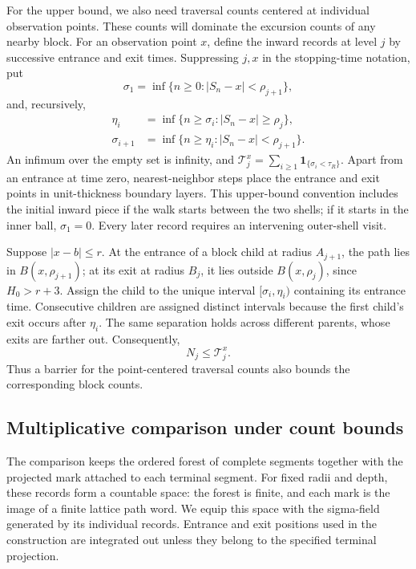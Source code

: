 \documentclass[11pt,a4paper]{article}
\numberwithin{equation}{section}
\theoremstyle{remark}
\begin{document}
For the upper bound, we also need traversal counts centered at individual observation points. These counts will dominate the excursion counts of any nearby block. For an observation point $x$, define the inward records at level $j$ by successive entrance and exit times. Suppressing $j,x$ in the stopping-time notation, put
\[
\sigma_1=\inf\{n\ge0:|S_n-x|<\rho_{j+1}\},
\]
and, recursively,
\begin{equation}\label{eq:traversal-stopping}
\begin{aligned}
\eta_i&=\inf\{n\ge\sigma_i:|S_n-x|\ge\rho_j\},\\
\sigma_{i+1}&=\inf\{n\ge\eta_i:|S_n-x|<\rho_{j+1}\}.
\end{aligned}
\end{equation}
An infimum over the empty set is infinity, and
$\mathcal T_j^x=\sum_{i\ge1}\mathbf1_{\{\sigma_i<\tau_R\}}$.
Apart from an entrance at time zero, nearest-neighbor steps place the entrance and exit points in unit-thickness boundary layers. This upper-bound convention includes the initial inward piece if the walk starts between the two shells; if it starts in the inner ball, $\sigma_1=0$. Every later record requires an intervening outer-shell visit.

Suppose $|x-b|\le r$. At the entrance of a block child at radius $A_{j+1}$, the path lies in $B(x,\rho_{j+1})$; at its exit at radius $B_j$, it lies outside $B(x,\rho_j)$, since $H_0>r+3$. Assign the child to the unique interval $[\sigma_i,\eta_i)$ containing its entrance time. Consecutive children are assigned distinct intervals because the first child's exit occurs after $\eta_i$. The same separation holds across different parents, whose exits are farther out. Consequently,
\begin{equation}\label{eq:2.22}
N_j\le\mathcal T_j^x.
\end{equation}
Thus a barrier for the point-centered traversal counts also bounds the corresponding block counts.

\subsection{Multiplicative comparison under count bounds}\label{sec:recordcomparison}
The comparison keeps the ordered forest of complete segments together with the projected mark attached to each terminal segment. For fixed radii and depth, these records form a countable space: the forest is finite, and each mark is the image of a finite lattice path word. We equip this space with the sigma-field generated by its individual records. Entrance and exit positions used in the construction are integrated out unless they belong to the specified terminal projection.
\end{document}
